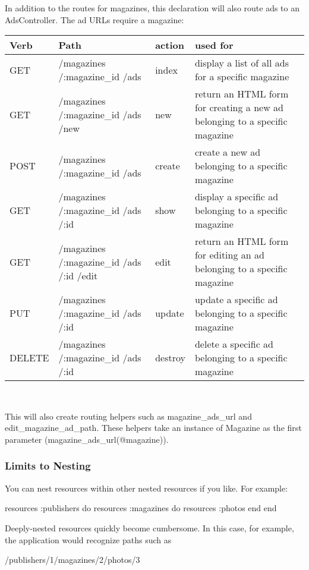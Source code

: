 \documentclass[10pt]{book}
\newenvironment{code}{%
  \scriptsize
    \verbatim
}{%
    \endverbatim
    \newline
}
\begin{document}
In addition to the routes for magazines, this declaration will also route ads to an AdsController. The ad URLs require a magazine:
\\
{\tiny
\noindent
\begin{tabular}{l|p{}|l|p{}}
\hline
\textbf{Verb} & \textbf{Path} & \textbf{action } & \textbf{used for} \\ 
\hline
GET &  /magazines /:magazine\_id /ads           & index     & display a list of all ads for a specific magazine                           \\ 
GET & /magazines /:magazine\_id /ads /new       & new       & return an HTML form for creating a new ad belonging to a specific magazine  \\ 
POST & /magazines /:magazine\_id /ads           & create    & create a new ad belonging to a specific magazine                            \\ 
GET & /magazines /:magazine\_id /ads /:id       & show      & display a specific ad belonging to a specific magazine                      \\ 
GET & /magazines /:magazine\_id /ads /:id /edit  & edit      & return an HTML form for editing an ad belonging to a specific magazine      \\ 
PUT & /magazines /:magazine\_id /ads /:id       & update    & update a specific ad belonging to a specific magazine                       \\ 
DELETE & /magazines /:magazine\_id /ads /:id       & destroy   & delete a specific ad belonging to a specific magazine                      
\end{tabular}\\
}

This will also create routing helpers such as magazine\_ads\_url and edit\_magazine\_ad\_path. These helpers take an instance of Magazine as the first parameter (magazine\_ads\_url(@magazine)).

\subsubsection{ Limits to Nesting}

You can nest resources within other nested resources if you like. For example:
\begin{code}
resources :publishers do
  resources :magazines do
    resources :photos
  end
end
\end{code}

Deeply-nested resources quickly become cumbersome. In this case, for example, the application would recognize paths such as
\begin{code}
/publishers/1/magazines/2/photos/3
\end{code}
\end{document}
